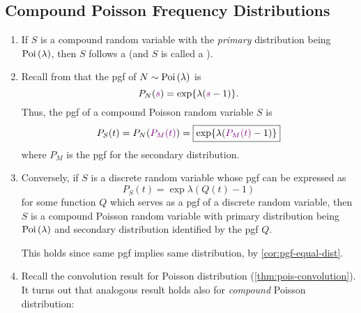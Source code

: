 \subsection{Compound Poisson Frequency Distributions}
\begin{enumerate}
\item If \(S\) is a compound random variable with the \emph{primary}
distribution being \(\operatorname{Poi}\left(\lambda\right)\), then \(S\) follows a  (and \(S\) is called a ).

\item \label{it:cpd-pois-pgf}
Recall from  that the pgf of
\(N\sim\operatorname{Poi}\left(\lambda\right)\) is
\[
P_N({\color{violet}s})=\exp{\lambda({\color{violet}s}-1)}.
\]
Thus, the pgf of a compound Poisson random variable \(S\) is
\[
P_S(t)=P_N({\color{violet}P_M(t)})=\boxed{\exp{\lambda({\color{violet}P_M(t)}-1)}}
\]
where \(P_M\) is the pgf for the secondary distribution.

\item \label{it:pgf-expr-for-cpd-pois}
Conversely, if \(S\) is a discrete random variable whose pgf can be
expressed as
\[
P_S(t)=\exp{\lambda(Q(t)-1)}
\]
for some function \(Q\) which serves as a pgf of a discrete random variable,
then \(S\) is a compound Poisson random variable with primary distribution
being \(\operatorname{Poi}\left(\lambda\right)\) and secondary distribution identified by the pgf
\(Q\).

\begin{note}
This holds since same pgf implies same distribution, by
\cref{cor:pgf-equal-dist}.
\end{note}

\item Recall the convolution result for Poisson distribution
(\cref{thm:pois-convolution}). It turns out that analogous result holds also
for \emph{compound} Poisson distribution:


\end{enumerate}
